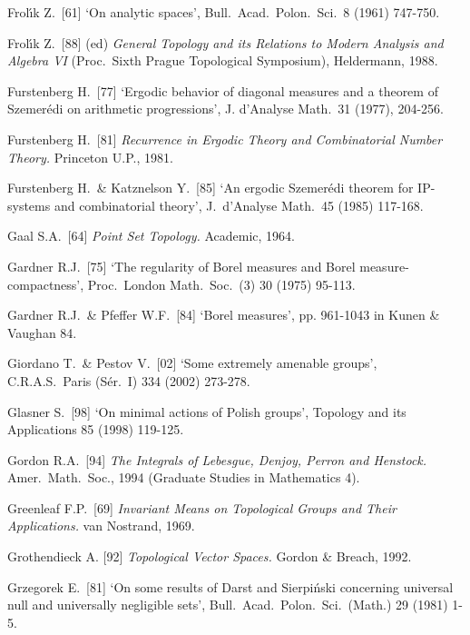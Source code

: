 {Frol{\'\i}k Z.\ [61] `On analytic spaces', Bull.\ Acad.\ Polon.\ Sci.\ 8
(1961) 747-750.
\cmmnt{[422F.]}

Frol\'\i k Z.\ [88] (ed) {\it General Topology and its Relations to
Modern Analysis and Algebra VI} (Proc.\ Sixth Prague Topological
Symposium), Heldermann, 1988.

Furstenberg H.\ [77]
`Ergodic behavior of diagonal measures and a theorem of Szemer\'edi
on arithmetic progressions', J. d'Analyse Math.\ 31 (1977), 204-256.

Furstenberg H.\ [81]
{\it Recurrence in Ergodic Theory and Combinatorial Number Theory.}
Princeton U.P., 1981.
\cmmnt{[\S497 {\it intro.}, 497N.]}

Furstenberg H.\ \& Katznelson Y.\ [85]
`An ergodic Szemer\'edi theorem for IP-systems and combinatorial theory',
J.\ d'Analyse Math.\ 45 (1985) 117-168.
\cmmnt{[\S497 {\it intro.}]}

\medskip%

Gaal S.A.\ [64] {\it Point Set Topology.}  Academic, 1964.
\cmmnt{[\S4A2.]}

Gardner R.J.\ [75] `The regularity of Borel measures and Borel
measure-compactness', Proc.\ London Math.\ Soc.\ (3) 30 (1975) 95-113.
\cmmnt{[438M.]}

Gardner R.J.\ \& Pfeffer W.F.\ [84] `Borel measures', pp. 961-1043 in
{\smc Kunen \& Vaughan 84}.
\cmmnt{[434G.]}

Giordano T.\ \& Pestov V.\ [02] `Some extremely amenable groups',
C.R.A.S.\ Paris (S\'er.\ I) 334 (2002) 273-278.
\cmmnt{[494I.]}

Glasner S.\ [98] `On minimal actions of Polish groups', Topology and its Applications 85 (1998) 119-125.
\cmmnt{[\S493 {\it notes\/}.]}

Gordon R.A.\ [94] {\it The Integrals of Lebesgue, Denjoy, Perron and
Henstock.}   Amer.\ Math.\ Soc., 1994 (Graduate Studies in Mathematics
4).
\cmmnt{[481Q, \S483 {\it notes\/}.]}

Greenleaf F.P.\ [69] {\it Invariant Means on Topological Groups and Their
Applications.}   van Nostrand, 1969.
\cmmnt{[\S449 {\it notes.}]}

Grothendieck A. [92] {\it Topological Vector Spaces.}  Gordon \& Breach,
1992.
\cmmnt{[\S462 {\it notes\/}.]}

Grzegorek E.\ [81] `On some results of Darst and Sierpi\'nski concerning
universal null and universally negligible sets', Bull.\ Acad.\ Polon.\
Sci.\ (Math.) 29 (1981) 1-5.
\cmmnt{[439F, \S439 {\it notes\/}.]}

}
